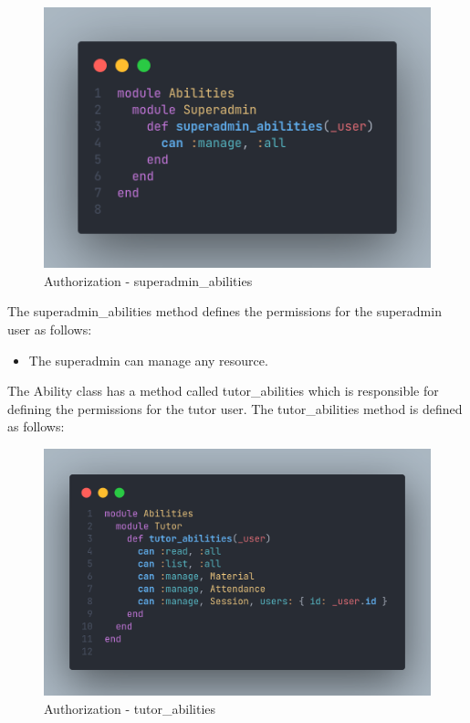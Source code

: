 \begin{justify}
            \begin{figure}[H]
                \centerline{\includegraphics[width=150mm,scale=1]{figures/implementation_and_testing/implementation/backend/SuperadminAbilities.png}}
                \caption{Authorization - superadmin\_abilities}
            \end{figure}

            \vspace{0.25cm}
            \newendline The superadmin\_abilities method defines the permissions for the superadmin user as follows:
                \begin{itemize}
                    \item The superadmin can manage any resource.
                \end{itemize}


        \vspace{0.25cm}
        \newendline The Ability class has a method called tutor\_abilities which is responsible for defining the permissions for the tutor user. The tutor\_abilities method is defined as follows:
            
            \begin{figure}[H]
                \centerline{\includegraphics[width=150mm,scale=1]{figures/implementation_and_testing/implementation/backend/TutorAbilities.png}}
                \caption{Authorization - tutor\_abilities}
            \end{figure}


\end{justify}
